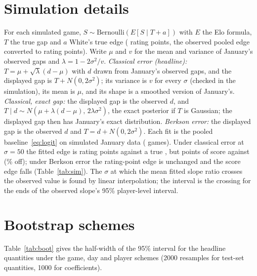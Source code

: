 \documentclass{article}
\begin{document}
\section{Simulation details}
\label{app:sim}

For each simulated game, $S \sim \text{Bernoulli}(E[S \mid T + a])$ with $E$ the Elo formula, $T$ the true gap and $a$ White's true edge (\simTrueEdgePts{} rating points, the observed pooled edge converted to rating points). Write $\mu$ and $v$ for the mean and variance of January's observed gaps and $\lambda = 1 - 2\sigma^2/v$. \emph{Classical error (headline):} $T = \mu + \sqrt{\lambda}(d - \mu)$ with $d$ drawn from January's observed gaps, and the displayed gap is $T + N(0, 2\sigma^2)$; its variance is $v$ for every $\sigma$ (checked in the simulation), its mean is $\mu$, and its shape is a smoothed version of January's. \emph{Classical, exact gap:} the displayed gap is the observed $d$, and $T \mid d \sim N(\mu + \lambda(d - \mu),\, 2\lambda\sigma^2)$, the exact posterior if $T$ is Gaussian; the displayed gap then has January's exact distribution. \emph{Berkson error:} the displayed gap is the observed $d$ and $T = d + N(0, 2\sigma^2)$. Each fit is the pooled baseline~\eqref{eq:logit} on simulated January data (\nGamesJan{} games). Under classical error at $\sigma = 50$ the fitted edge is \simClassEdgePtsFifty{} rating points against a true \simTrueEdgePts{}, but \simClassEdgePPFifty{} points of score against \simTruePP{} (\simClassEdgePPErr\% off); under Berkson error the rating-point edge is unchanged and the score edge falls (Table~\ref{tab:sim}). The $\sigma$ at which the mean fitted slope ratio crosses the observed value is found by linear interpolation; the interval is the crossing for the ends of the observed slope's 95\% player-level interval.

\begin{table}[h]
  \centering
  \caption{Simulated fitted slope ratio and fitted White's edge (percentage points of expected score; rating points) against per-player noise $\sigma$, means over 20 seeds. The true edge is \simTruePP{} points of score, \simTrueEdgePts{} rating points; ``--'' where the construction needs more noise than the gap variance allows.}
  \label{tab:sim}
  \scriptsize
  \resizebox{\textwidth}{!}{}
\end{table}

\section{Bootstrap schemes}
\label{app:boot}

Table~\ref{tab:boot} gives the half-width of the 95\% interval for the headline quantities under the game, day and player schemes (2000 resamples for test-set quantities, 1000 for coefficients).

\begin{table}[h]
  \centering
  \caption{Half-widths of 95\% bootstrap intervals under three resampling schemes, on the same data. Player resampling widens intervals by a factor of \ratioMin--\ratioMax{} relative to day resampling.}
  \label{tab:boot}
  \small
  
\end{table}
\end{document}
